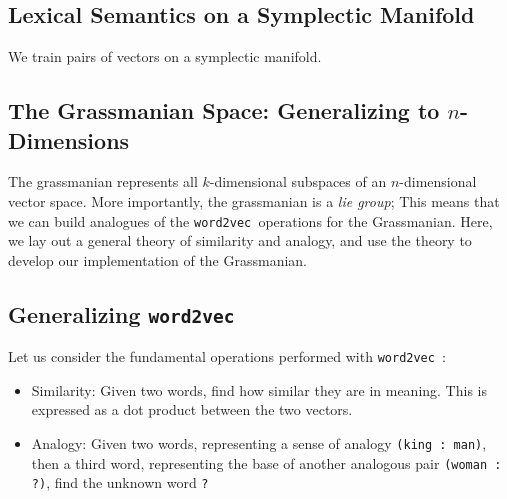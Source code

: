 \documentclass{book}
\newcommand{\wtov}{\texttt{word2vec }}
\begin{document}

\subsection{Lexical Semantics on a Symplectic Manifold}

We train pairs of vectors on a symplectic manifold.

\subsection{The Grassmanian Space: Generalizing to $n$-Dimensions}

The grassmanian represents all $k$-dimensional subspaces of an $n$-dimensional
vector space. More importantly, the grassmanian is a \emph{lie group}; This means
that we can build analogues of the \wtov operations for the Grassmanian. Here,
we lay out a general theory of similarity and analogy, and use the theory to
develop our implementation of the Grassmanian.

\subsection{Generalizing \wtov}

Let us consider the fundamental operations performed with \wtov:

\begin{itemize}
\item Similarity: Given two words, find how similar they are in meaning. This is
     expressed as a dot product between the two vectors.
\item Analogy: Given two words, representing a sense of analogy \texttt{(king : man)},
      then a third word, representing the base of another analogous
      pair \texttt{(woman : ?)}, find the unknown word \texttt{?}
\end{itemize}
\end{document}
